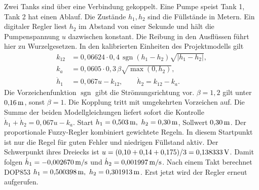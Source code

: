Zwei Tanks sind über eine Verbindung gekoppelt. Eine Pumpe speist Tank 1, Tank 2 hat einen Ablauf. Die Zustände \(h_1,h_2\) sind die Füllstände in Metern. Ein digitaler Regler liest \(h_2\) im Abstand von einer Sekunde und hält die Pumpenspannung \(u\) dazwischen konstant. Die Reibung in den Ausflüssen führt hier zu Wurzelgesetzen. In den kalibrierten Einheiten des Projektmodells gilt
\[
 \begin{aligned}
 k_{12}&=0{,}06624\cdot0{,}4\,\operatorname{sgn}(h_1-h_2)\sqrt{|h_1-h_2|},\\
 k_a&=0{,}0605\cdot0{,}3\,\beta\sqrt{\max(0,h_2)},\\
 \dot h_1&=0{,}067u-k_{12},\qquad \dot h_2=k_{12}-k_a .
 \end{aligned}
\]
Die Vorzeichenfunktion \(\operatorname{sgn}\) gibt die Strömungsrichtung vor. \(\beta=1{,}2\) gilt unter \(0{,}16\,\mathrm{m}\), sonst \(\beta=1\). Die Kopplung tritt mit umgekehrten Vorzeichen auf. Die Summe der beiden Modellgleichungen liefert sofort die Kontrolle \(\dot h_1+\dot h_2=0{,}067u-k_a\).
Start \(h_1=0{,}503\,\mathrm{m},\ h_2=0{,}30\,\mathrm{m}\), Sollwert \(0{,}30\,\mathrm{m}\). Der proportionale Fuzzy-Regler kombiniert gewichtete Regeln. In diesem Startpunkt ist nur die Regel für guten Fehler und niedrigen Füllstand aktiv. Der Schwerpunkt ihres Dreiecks ist \(u=(0{,}10+0{,}14+0{,}175)/3=0{,}138333\,\mathrm{V}\). Damit folgen \(\dot h_1=-0{,}002670\,\mathrm{m/s}\) und \(\dot h_2=0{,}001997\,\mathrm{m/s}\). Nach einem Takt berechnet DOP853 \(h_1=0{,}500398\,\mathrm{m},\ h_2=0{,}301913\,\mathrm{m}\). Erst jetzt wird der Regler erneut aufgerufen.

